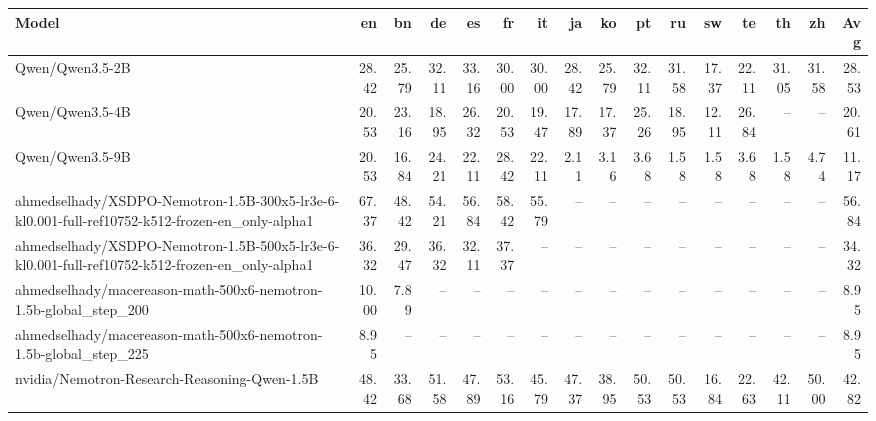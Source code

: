 \begin{tabular}{lrrrrrrrrrrrrrrr}
\hline
Model & en & bn & de & es & fr & it & ja & ko & pt & ru & sw & te & th & zh & Avg \\
\hline
Qwen/Qwen3.5-2B & 28.42 & 25.79 & 32.11 & 33.16 & 30.00 & 30.00 & 28.42 & 25.79 & 32.11 & 31.58 & 17.37 & 22.11 & 31.05 & 31.58 & 28.53 \\
Qwen/Qwen3.5-4B & 20.53 & 23.16 & 18.95 & 26.32 & 20.53 & 19.47 & 17.89 & 17.37 & 25.26 & 18.95 & 12.11 & 26.84 & -- & -- & 20.61 \\
Qwen/Qwen3.5-9B & 20.53 & 16.84 & 24.21 & 22.11 & 28.42 & 22.11 & 2.11 & 3.16 & 3.68 & 1.58 & 1.58 & 3.68 & 1.58 & 4.74 & 11.17 \\
ahmedselhady/XSDPO-Nemotron-1.5B-300x5-lr3e-6-kl0.001-full-ref10752-k512-frozen-en\_only-alpha1 & 67.37 & 48.42 & 54.21 & 56.84 & 58.42 & 55.79 & -- & -- & -- & -- & -- & -- & -- & -- & 56.84 \\
ahmedselhady/XSDPO-Nemotron-1.5B-500x5-lr3e-6-kl0.001-full-ref10752-k512-frozen-en\_only-alpha1 & 36.32 & 29.47 & 36.32 & 32.11 & 37.37 & -- & -- & -- & -- & -- & -- & -- & -- & -- & 34.32 \\
ahmedselhady/macereason-math-500x6-nemotron-1.5b-global\_step\_200 & 10.00 & 7.89 & -- & -- & -- & -- & -- & -- & -- & -- & -- & -- & -- & -- & 8.95 \\
ahmedselhady/macereason-math-500x6-nemotron-1.5b-global\_step\_225 & 8.95 & -- & -- & -- & -- & -- & -- & -- & -- & -- & -- & -- & -- & -- & 8.95 \\
nvidia/Nemotron-Research-Reasoning-Qwen-1.5B & 48.42 & 33.68 & 51.58 & 47.89 & 53.16 & 45.79 & 47.37 & 38.95 & 50.53 & 50.53 & 16.84 & 22.63 & 42.11 & 50.00 & 42.82 \\
\hline
\end{tabular}
